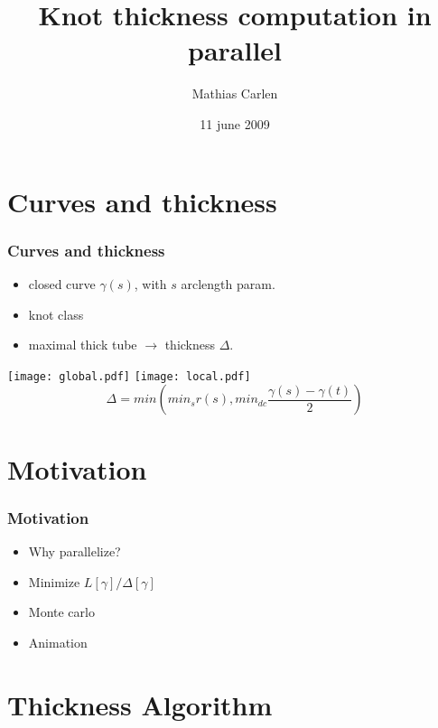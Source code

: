 \documentclass{beamer}
\title{Knot thickness computation in parallel}
\author{Mathias Carlen}
\date{11 june 2009}
\begin{document}
\frame{\titlepage}


\section{Curves and thickness}

\begin{frame}
\frametitle{Curves and thickness}

\begin{itemize}
 \item<1-> closed curve $\gamma(s)$, with $s$ arclength param.
 \item<2-> knot class
 \item<3-> maximal thick tube $\longrightarrow$ thickness $\Delta$.
\end{itemize}
\vspace{1cm}
\pause
\pause
\pause
\texttt{[image: global.pdf]}\hspace{.2cm}
\pause
\texttt{[image: local.pdf]}
\pause
\[
\Delta = min ( min_s r(s) , min_{dc} \frac{\gamma(s)-\gamma(t)}{2} )
\]
\end{frame}

\section{Motivation}
\begin{frame}
\frametitle{Motivation}
\begin{itemize}
\item<1-> Why parallelize?
\item<2-> Minimize $L[\gamma]/\Delta[\gamma]$
\item<3-> Monte carlo
\item<4-> Animation
\end{itemize}
\end{frame}

\section{Thickness Algorithm}
\end{document}
